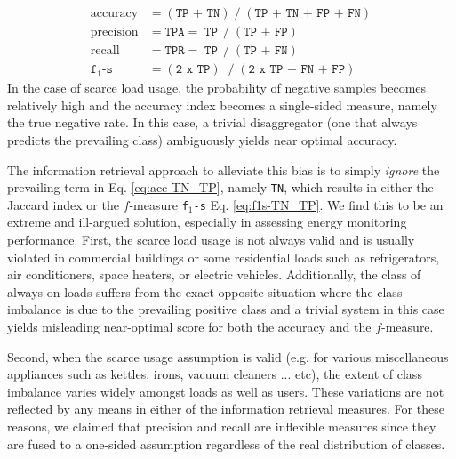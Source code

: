 \documentclass[twocolumn,letter,10pt]{IEEEtran} %
\begin{document}
{\small
	\begin{align}
	\text{accuracy}  &= (\texttt{TP + TN})\;/\;(\texttt{TP + TN + FP + FN}) 	\label{eq:acc-TN_TP}\\
	\text{precision} &= \texttt{TPA} = \;\texttt{TP}\,\;/\;(\texttt{TP + FP})   \nonumber \\
	\text{recall}    &= \texttt{TPR} = \;\texttt{TP}\,\;/\;(\texttt{TP + FN})   \nonumber \\
	\texttt{f$_1$-s} &= (\texttt{2 x TP})\;\;/\;(\texttt{2 x TP + FN + FP})  	\label{eq:f1s-TN_TP}
	\end{align}}%
In the case of scarce load usage, the probability of negative samples becomes relatively high and the accuracy index becomes a single-sided measure, namely the true negative rate. In this case, a trivial disaggregator (one that always predicts the prevailing class) ambiguously yields near optimal accuracy.

The information retrieval approach to alleviate this bias is to simply \emph{ignore} the prevailing term in Eq. \ref{eq:acc-TN_TP}, namely \texttt{TN}, which results in either the Jaccard index or the $f$-measure \texttt{f$_1$-s} Eq. \ref{eq:f1s-TN_TP}. We find this to be an extreme and ill-argued solution, especially in assessing energy monitoring performance. First, the scarce load usage is not always valid and is usually violated in commercial buildings or some residential loads such as refrigerators, air conditioners, space heaters, or electric vehicles. Additionally, the class of always-on loads suffers from the exact opposite situation where the class imbalance is due to the prevailing positive class and a trivial system in this case yields misleading near-optimal score for both the accuracy and the $f$-measure.

Second, when the scarce usage assumption is valid (e.g. for various miscellaneous appliances such as kettles, irons, vacuum cleaners ... etc), the extent of class imbalance varies widely amongst loads as well as users. These variations are not reflected by any means in either of the information retrieval measures. For these reasons, we claimed that precision and recall are inflexible measures since they are fused to a one-sided assumption regardless of the real distribution of classes.
\end{document}
